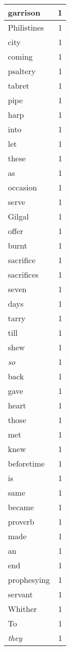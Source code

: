 \begin{center}
\begin{longtable}{l|r}
garrison & 1 \\ \hline
Philistines & 1 \\ \hline
city & 1 \\ \hline
coming & 1 \\ \hline
psaltery & 1 \\ \hline
tabret & 1 \\ \hline
pipe & 1 \\ \hline
harp & 1 \\ \hline
into & 1 \\ \hline
let & 1 \\ \hline
these & 1 \\ \hline
as & 1 \\ \hline
occasion & 1 \\ \hline
serve & 1 \\ \hline
Gilgal & 1 \\ \hline
offer & 1 \\ \hline
burnt & 1 \\ \hline
sacrifice & 1 \\ \hline
sacrifices & 1 \\ \hline
seven & 1 \\ \hline
days & 1 \\ \hline
tarry & 1 \\ \hline
till & 1 \\ \hline
shew & 1 \\ \hline
\emph{so} & 1 \\ \hline
back & 1 \\ \hline
gave & 1 \\ \hline
heart & 1 \\ \hline
those & 1 \\ \hline
met & 1 \\ \hline
knew & 1 \\ \hline
beforetime & 1 \\ \hline
is & 1 \\ \hline
same & 1 \\ \hline
became & 1 \\ \hline
proverb & 1 \\ \hline
made & 1 \\ \hline
an & 1 \\ \hline
end & 1 \\ \hline
prophesying & 1 \\ \hline
servant & 1 \\ \hline
Whither & 1 \\ \hline
To & 1 \\ \hline
\emph{they} & 1 \\ \hline

\end{longtable}
\end{center}
